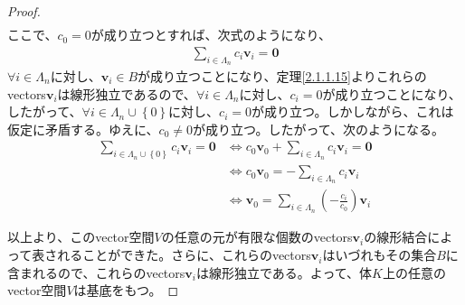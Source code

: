 \documentclass[dvipdfmx]{jsarticle}
\begin{document}
\begin{proof}
\begin{align*}
\end{align*}
ここで、$c_{0} = 0$が成り立つとすれば、次式のようになり、
\begin{align*}
\sum_{i \in \varLambda_{n}} {c_{i}\mathbf{v}_{i}} = \mathbf{0}
\end{align*}
$\forall i \in \varLambda_{n}$に対し、$\mathbf{v}_{i} \in B$が成り立つことになり、定理\ref{2.1.1.15}よりこれらのvectors$\mathbf{v}_{i}$は線形独立であるので、$\forall i \in \varLambda_{n}$に対し、$c_{i} = 0$が成り立つことになり、したがって、$\forall i \in \varLambda_{n} \cup \left\{ 0 \right\}$に対し、$c_{i} = 0$が成り立つ。しかしながら、これは仮定に矛盾する。ゆえに、$c_{0} \neq 0$が成り立つ。したがって、次のようになる。
\begin{align*}
\sum_{i \in \varLambda_{n} \cup \left\{ 0 \right\}} {c_{i}\mathbf{v}_{i}} = \mathbf{0} &\Leftrightarrow c_{0}\mathbf{v}_{0} + \sum_{i \in \varLambda_{n}} {c_{i}\mathbf{v}_{i}} = \mathbf{0}\\
&\Leftrightarrow c_{0}\mathbf{v}_{0} = - \sum_{i \in \varLambda_{n}} {c_{i}\mathbf{v}_{i}}\\
&\Leftrightarrow \mathbf{v}_{0} = \sum_{i \in \varLambda_{n}} {\left( - \frac{c_{i}}{c_{0}} \right)\mathbf{v}_{i}}
\end{align*}\par
以上より、このvector空間$V$の任意の元が有限な個数のvectors$\mathbf{v}_{i}$の線形結合によって表されることができた。さらに、これらのvectors$\mathbf{v}_{i}$はいづれもその集合$B$に含まれるので、これらのvectors$\mathbf{v}_{i}$は線形独立である。よって、体$K$上の任意のvector空間$V$は基底をもつ。
\end{proof}
\end{document}

